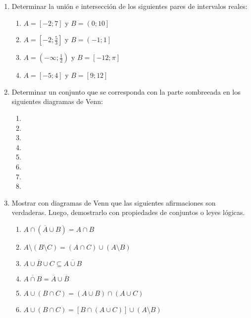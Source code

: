 \documentclass[a4paper]{article}
\newcommand{\exercise}{\item}
\newcommand{\intersec}{\cap}
\newcommand{\union}{\cup}
\newcommand{\compl}[1]{\overline{#1}}
\newcommand{\df}[2]{\displaystyle\frac{#1}{#2}}
\newcommand{\img}[2]{ \begin{minipage}[t]{\linewidth} \raisebox{-\height}{\texttt{[image: \#2]}} \end{minipage} } %
\begin{document}
\begin{enumerate}
	\exercise Determinar la unión e intersección de los siguientes pares de intervalos reales: 
	\begin{multicols}{3}
	\begin{enumerate} [label=(\alph*)]
		\item $A=\left[-2;7\right]$  y $B=\left(0;10\right]$
		\item $A=\left[-2;\df{5}{3}\right]$  y $B=\left(-1;1\right]$
		\item $A=\left(-\infty;\df{1}{2}\right)$  y $B=\left[-12;\pi \right]$
		\item $A=\left[-5;4\right]$  y $B=\left[9;12\right]$
	\end{enumerate}
	\end{multicols}
	\exercise Determinar un conjunto que se corresponda con la parte sombreeada en los siguientes diagramas de Venn:
	\begin{multicols}{2}
	\begin{enumerate} [label=(\alph*)]
		\item \img{4cm}{img/conj1.png}
		\item \img{4cm}{img/conj3.png}
		\item \img{4cm}{img/conj7.png}
		\item \img{4cm}{img/conj4.png}
		\item \img{4cm}{img/conj5.png}
		\item \img{4cm}{img/conj6.png}
		\item \img{4cm}{img/conj2.png}
		\item \img{4cm}{img/conj8.png}
	\end{enumerate}
	\end{multicols}
	\exercise Mostrar con diagramas de Venn que las siguientes afirmaciones son verdaderas. Luego, demostrarlo con propiedades de conjuntos o leyes lógicas.
	\begin{multicols}{2}
	\begin{enumerate} [label=(\alph*)]
		\item $A \intersec (\compl{A} \union B) = A \intersec B$
		\item $A \setminus (B \setminus C) = (A \intersec C) \union (A \setminus B)$
		\item $\compl{A \union B \union C} \subseteq \compl{A \union B}$
		\item $\compl{A \intersec B} = \compl{A} \union \compl{B}$
		\item $A \union (B \intersec C) = (A\union B) \intersec (A \union C)$ 
		\item $A \union (B \intersec C) = [B \intersec (A \union C)] \union (A \setminus B)$

\end{enumerate}
\end{multicols}
\end{enumerate}
\end{document}

